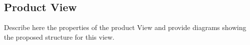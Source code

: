 \subsection{Product View}

Describe here the properties of the product View and provide diagrams showing the proposed structure for this view.